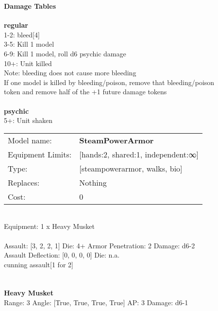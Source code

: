 {\bf Damage Tables} \\
\ \\ {\bf regular } \\
1-2: bleed[4] \\
3-5: Kill 1 model \\
6-9: Kill 1 model, roll d6 psychic damage \\
10+: Unit killed \\ Note: bleeding does not cause more bleeding \\ If one model is killed by bleeding/poison, remove that bleeding/poison \\ token and remove half of the +1 future damage tokens \\
\ \\ {\bf psychic } \\
5+: Unit shaken \\


\noindent
\begin{tabular}{ll}
Model name: &{\bf SteamPowerArmor } \\
Equipment Limits: &[hands:2, shared:1, independent:∞] \\
Type: &[steampowerarmor, walks, bio] \\
Replaces: &Nothing \\
Cost: & 0\\
\end{tabular}
\ \\
Equipment: 1 x Heavy Musket \\
\ \\
Assault: [3, 2, 2, 1] Die: 4+ Armor Penetration: 2 Damage: d6-2 \\
Assault Deflection: [0, 0, 0, 0] Die: n.a.\\
\indent cunning assault[1 for 2]\\ 
 
\ \\

\ \\
{\bf Heavy Musket } \\



Range: 3  Angle: [True, True, True, True] AP: 3 Damage: d6-1 \\




 
\ \\













